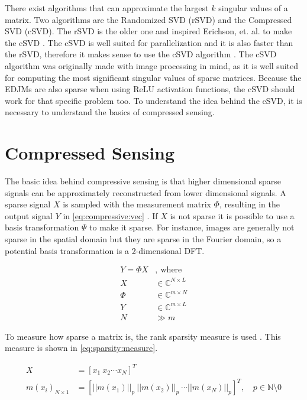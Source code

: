There exist algorithms that can approximate the largest $k$ singular values of a matrix. Two algorithms are the Randomized SVD (rSVD) and the Compressed SVD (cSVD). The rSVD is the older one and inspired Erichson, et. al. to make the cSVD \cite{erichson:csvd}. The cSVD is well suited for parallelization and it is also faster than the rSVD, therefore it makes sense to use the cSVD algorithm \cite{erichson:csvd}. The cSVD algorithm was originally made with image processing in mind, as it is well suited for computing the most significant singular values of sparse matrices. Because the EDJMs are also sparse when using ReLU activation functions, the cSVD should work for that specific problem too. To understand the idea behind the cSVD, it is necessary to understand the basics of compressed sensing.

\section{Compressed Sensing}

The basic idea behind compressive sensing is that higher dimensional sparse signals can be approximately reconstructed from lower dimensional signals. A sparse signal $X$ is sampled with the measurement matrix $\Phi$, resulting in the output signal $Y$ in \eqref{eq:compressive:vec} \cite{chen:mmv}. If $X$ is not sparse it is possible to use a basis transformation $\Psi$ to make it sparse. For instance, images are generally not sparse in the spatial domain but they are sparse in the Fourier domain, so a potential basis transformation is a 2-dimensional DFT.

\begin{equation} \label{eq:compressive:vec}
\begin{split}
    Y = \Phi X &, \ \mathrm{where}      \\
    X &\in \mathbb{C}^{N \times L}      \\
    \Phi &\in \mathbb{C}^{m \times N}   \\
    Y &\in \mathbb{C}^{m \times L}      \\
    N &\gg m
\end{split}
\end{equation}

To measure how sparse a matrix is, the rank sparsity measure is used \cite{chen:mmv}. This measure is shown in \eqref{eq:sparsity:measure}.

\begin{equation} \label{eq:sparsity:measure}
  \begin{split}
      X &= [x_1\ x_2 \cdots x_N]^T \\
      m(x_i)_{N \times 1} &= [||m(x_1)||_p\ ||m(x_2)||_p\ \cdots ||m(x_N)||_p]^T,\quad p \in \mathbb{N}\setminus 0
  \end{split}
\end{equation}

